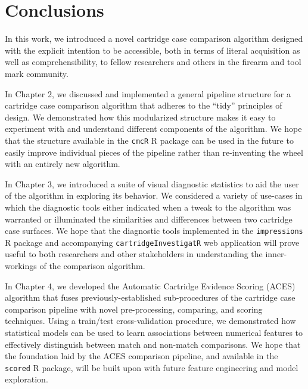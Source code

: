 \documentclass[11pt,]{isuthesis}
\begin{document}
\hypertarget{conclusions}{%
\chapter{Conclusions}\label{conclusions}}

In this work, we introduced a novel cartridge case comparison algorithm designed with the explicit intention to be accessible, both in terms of literal acquisition as well as comprehensibility, to fellow researchers and others in the firearm and tool mark community.

In Chapter 2, we discussed and implemented a general pipeline structure for a cartridge case comparison algorithm that adheres to the ``tidy'' principles of design.
We demonstrated how this modularized structure makes it easy to experiment with and understand different components of the algorithm.
We hope that the structure available in the \texttt{cmcR} R package can be used in the future to easily improve individual pieces of the pipeline rather than re-inventing the wheel with an entirely new algorithm.

In Chapter 3, we introduced a suite of visual diagnostic statistics to aid the user of the algorithm in exploring its behavior.
We considered a variety of use-cases in which the diagnostic tools either indicated when a tweak to the algorithm was warranted or illuminated the similarities and differences between two cartridge case surfaces.
We hope that the diagnostic tools implemented in the \texttt{impressions} R package and accompanying \texttt{cartridgeInvestigatR} web application will prove useful to both researchers and other stakeholders in understanding the inner-workings of the comparison algorithm.

In Chapter 4, we developed the Automatic Cartridge Evidence Scoring (ACES) algorithm that fuses previously-established sub-procedures of the cartridge case comparison pipeline with novel pre-processing, comparing, and scoring techniques.
Using a train/test cross-validation procedure, we demonstrated how statistical models can be used to learn associations between numerical features to effectively distinguish between match and non-match comparisons.
We hope that the foundation laid by the ACES comparison pipeline, and available in the \texttt{scored} R package, will be built upon with future feature engineering and model exploration.
\end{document}
